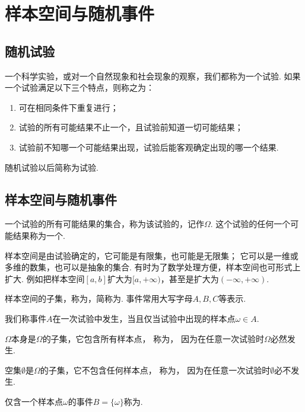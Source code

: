 \section{样本空间与随机事件}
\subsection{随机试验}
\begin{definition}
一个科学实验，或对一个自然现象和社会现象的观察，我们都称为一个试验.
如果一个试验满足以下三个特点，则称之为：
\begin{enumerate}
	\item 可在相同条件下重复进行；
	\item 试验的所有可能结果不止一个，且试验前知道一切可能结果；
	\item 试验前不知哪一个可能结果出现，试验后能客观确定出现的哪一个结果.
\end{enumerate}
\end{definition}
随机试验以后简称为试验.

\subsection{样本空间与随机事件}
\begin{definition}
一个试验的所有可能结果的集合，称为该试验的，记作\(\Omega\).
这个试验的任何一个可能结果称为一个.
\end{definition}

样本空间是由试验确定的，它可能是有限集，也可能是无限集；
它可以是一维或多维的数集，也可以是抽象的集合.
有时为了数学处理方便，样本空间也可形式上扩大.
例如把样本空间\([a,b]\)扩大为\([a,+\infty)\)，甚至是扩大为\((-\infty,+\infty)\).

\begin{definition}
样本空间的子集，称为，简称为.
事件常用大写字母\(A,B,C\)等表示.

我们称事件\(A\)在一次试验中发生，当且仅当试验中出现的样本点\(\omega \in A\).
\end{definition}

\begin{definition}
\(\Omega\)本身是\(\Omega\)的子集，它包含所有样本点，
称为，
因为在任意一次试验时\(\Omega\)必然发生.

空集\(\emptyset\)是\(\Omega\)的子集，它不包含任何样本点，
称为，
因为在任意一次试验时\(\emptyset\)必不发生.

仅含一个样本点\(\omega\)的事件\(B = \{\omega\}\)称为.
\end{definition}

